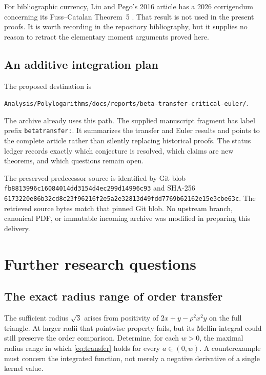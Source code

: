 \documentclass[11pt]{article}
\numberwithin{equation}{section}
\theoremstyle{definition}\newtheorem{definition}[theorem]{Definition}
\theoremstyle{remark}\newtheorem{remark}[theorem]{Remark}
\begin{document}
For bibliographic currency, Liu and Pego's 2016 article has a 2026
corrigendum concerning its Fuss--Catalan Theorem~5 \cite{liupegoerr}.
That result is not used in the present proofs. It is worth recording
in the repository bibliography, but it supplies no reason to retract
the elementary moment arguments proved here.

\subsection{An additive integration plan}
The proposed destination is
\begin{center}\small
\nolinkurl{Analysis/Polylogarithms/docs/reports/beta-transfer-critical-euler/}.
\end{center}
The archive already uses this path. The supplied manuscript fragment
has label prefix \texttt{betatransfer:}. It summarizes the transfer
and Euler results and points to the complete article rather than
silently replacing historical proofs. The status ledger records
exactly which conjecture is resolved, which claims are new theorems,
and which questions remain open.

The preserved predecessor source is identified by Git blob
\nolinkurl{fb8813996c16084014dd3154d4ec299d14996c93} and SHA-256
\nolinkurl{6173220e86b32cd8c23f96216f2e5a2e32813d49fdd7769b62162e15e3cbe63c}.
The retrieved source bytes match that pinned Git blob. No upstream
branch, canonical PDF, or immutable incoming archive was modified in
preparing this delivery.

\section{Further research questions}
\label{sec:future}

\subsection{The exact radius range of order transfer}
The sufficient radius $\sqrt3$ arises from positivity of
$2x+y-\rho^2x^2y$ on the full triangle. At larger radii that pointwise
property fails, but its Mellin integral could still preserve the
order comparison. Determine, for each $w>0$, the maximal radius
range in which \eqref{eq:transfer} holds for every $a\in(0,w)$.
A counterexample must concern the integrated function, not merely a
negative derivative of a single kernel value.
\end{document}
